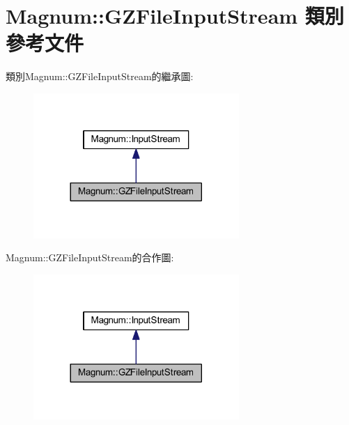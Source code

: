\hypertarget{class_magnum_1_1_g_z_file_input_stream}{}\section{Magnum\+:\+:G\+Z\+File\+Input\+Stream 類別 參考文件}
\label{class_magnum_1_1_g_z_file_input_stream}


類別\+Magnum\+:\+:G\+Z\+File\+Input\+Stream的繼承圖\+:\nopagebreak
\begin{figure}[H]
\begin{center}
\leavevmode
\includegraphics[width=221pt]{class_magnum_1_1_g_z_file_input_stream__inherit__graph}
\end{center}
\end{figure}


Magnum\+:\+:G\+Z\+File\+Input\+Stream的合作圖\+:\nopagebreak
\begin{figure}[H]
\begin{center}
\leavevmode
\includegraphics[width=221pt]{class_magnum_1_1_g_z_file_input_stream__coll__graph}
\end{center}
\end{figure}
